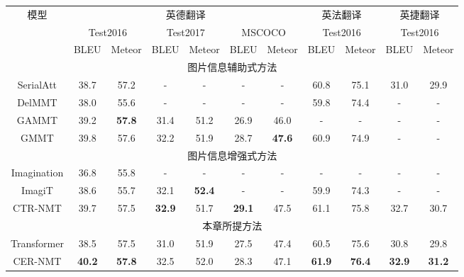 
\begin{table}[!htbp]
    \label{tab:4_ende_enfr_encs}
    \centering
    \footnotesize%
    \setlength{\tabcolsep}{4pt}%
    \renewcommand{\arraystretch}{1.2}%
\begin{tabular}{ccccccccccc}
\hline
 \multirow{3}{*}{模型} & \multicolumn{6}{c}{英德翻译} & \multicolumn{2}{c}{英法翻译} & \multicolumn{2}{c}{英捷翻译} \\
\cmidrule(r){2-7} \cmidrule(r){8-9} \cmidrule(r){10-11}%
       & \multicolumn{2}{c}{Test2016} & \multicolumn{2}{c}{Test2017} & \multicolumn{2}{c}{MSCOCO} & \multicolumn{2}{c}{Test2016} & \multicolumn{2}{c}{Test2016} \\
\cline{2-11}%
              &    BLEU & Meteor &     BLEU & Meteor &     BLEU & Meteor &     BLEU & Meteor  &   BLEU & Meteor \\
\hline
\multicolumn{11}{c}{图片信息辅助式方法} \\
\hline
SerialAtt      & 38.7 & 57.2 & - & - & - & - & 60.8 & 75.1 & 31.0 & 29.9 \\
DelMMT           & 38.0 & 55.6 & - & - & - & - & 59.8 & 74.4 & - & -\\
GAMMT      & 39.2 & {\textbf{57.8}} & 31.4 & 51.2 & 26.9 & 46.0 & - & - & - & -\\
GMMT             & 39.8 & 57.6 & 32.2 & 51.9 & 28.7 & {\textbf{47.6}} & 60.9 & 74.9 & - & -\\
\hline
\multicolumn{11}{c}{图片信息增强式方法} \\
\hline
Imagination      & 36.8 & 55.8 & - & - & - & - & - & - & - & -\\
ImagiT   & 38.6 & 55.7 & 32.1 & {\textbf{52.4}} & - & - & 59.9 & 74.3 & - & -\\
CTR-NMT             & 39.7 & 57.5 & {\textbf{32.9}} & 51.7 & {\textbf{29.1}} & 47.5 & 61.1 & 75.8 & 32.7 & 30.7\\
\hline
\multicolumn{11}{c}{本章所提方法} \\
\hline
Transformer             & 38.5 & 57.5 & 31.0 & 51.9 & 27.5 & 47.4 & 60.5 & 75.6 & 30.8 & 29.8 \\
CER-NMT          & {\textbf{40.2}} & {\textbf{57.8}} & 32.5 & 52.0 & 28.3 & 47.1 & {\textbf{61.9}} & {\textbf{76.4}} & {\textbf{32.9}} & {\textbf{31.2}}\\
\bottomrule
\end{tabular}
\end{table}